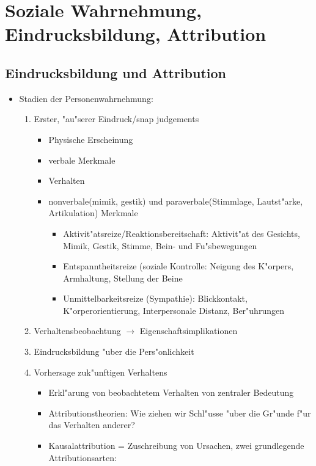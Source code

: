 
\section{Soziale Wahrnehmung, Eindrucksbildung, Attribution}
\subsection{Eindrucksbildung und Attribution}
\begin{itemize}
	\item
		Stadien der Personenwahrnehmung:
		\begin{enumerate}
			\item
				Erster, "au"serer Eindruck/snap judgements
				\begin{itemize}
					\item
						Physische Erscheinung
					\item
						verbale Merkmale
					\item
						Verhalten
					\item
						nonverbale(mimik, gestik) und paraverbale(Stimmlage, Lautst"arke, Artikulation)  Merkmale
						\begin{itemize}
							\item
								Aktivit"atsreize/Reaktionsbereitschaft: Aktivit"at des Gesichts, Mimik, Gestik, Stimme, Bein- und Fu"sbewegungen
							\item
								Entspanntheitsreize (soziale Kontrolle: Neigung des K"orpers, Armhaltung, Stellung der Beine
							\item
								Unmittelbarkeitsreize (Sympathie): Blickkontakt, K"orperorientierung, Interpersonale Distanz, Ber"uhrungen
						\end{itemize}
				\end{itemize}
			\item
				Verhaltensbeobachtung  $\rightarrow$ Eigenschaftsimplikationen
			\item
				Eindrucksbildung "uber die Pers"onlichkeit
			\item
				Vorhersage zuk"unftigen Verhaltens
				\begin{itemize}
					\item
						Erkl"arung von beobachtetem Verhalten von zentraler Bedeutung
					\item
						Attributionstheorien: Wie ziehen wir Schl"usse "uber die Gr"unde f"ur das Verhalten anderer?
					\item
						Kausalattribution = Zuschreibung von Ursachen, zwei grundlegende Attributionsarten:
						\begin{itemize}

\end{itemize}
\end{itemize}
\end{enumerate}
\end{itemize}
